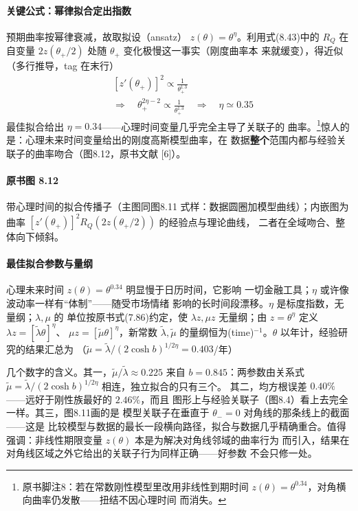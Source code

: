 \paragraph{关键公式：幂律拟合定出指数}
预期曲率按幂律衰减，故取拟设（ansatz）
$z(\theta)=\theta^{\eta}$。利用式(8.43)中的 $R_{Q}$ 在自变量
$2z(\theta_{+}/2)$ 处随 $\theta_{+}$ 变化极慢这一事实（刚度曲率本
来就缓变），得近似（多行推导，tag 在末行）
\begin{align*}
&[z'(\theta_{+})]^{2}\propto\frac{1}{\theta_{+}^{1.3}}\\
&\Rightarrow\quad\theta_{+}^{2\eta-2}\propto\frac{1}{\theta_{+}^{1.3}}
\quad\Rightarrow\quad\eta\simeq0.35
\tag{8.44}
\end{align*}
最佳拟合给出 $\eta=0.34$——心理时间变量几乎完全主导了关联子的
曲率。\footnote{原书脚注8：若在常数刚性模型里改用非线性到期时间
$z(\theta)=\theta^{0.34}$，对角横向曲率仍发散——扭结不因心理时间
而消失。}惊人的是：心理未来时间变量给出的刚度高斯模型曲率，在
数据\textbf{整个}范围内都与经验关联子的曲率吻合（图8.12，原书文献
[6]）。
\paragraph{原书图 8.12}\quad 带心理时间的拟合传播子（主图同图8.11
式样：数据圆圈加模型曲线）；内嵌图为曲率
$[z'(\theta_{+})]^{2}R_{Q}(2z(\theta_{+}/2))$ 的经验点与理论曲线，
二者在全域吻合、整体向下倾斜。

\paragraph{最佳拟合参数与量纲}
心理未来时间 $z(\theta)=\theta^{0.34}$ 明显慢于日历时间，它影响
一切金融工具；$\eta$ 或许像波动率一样有“体制”——随受市场情绪
影响的长时间段漂移。$\eta$ 是标度指数，无量纲；$\lambda,\mu$ 的
单位按原书式(7.86)约定，使 $\lambda z,\mu z$ 无量纲；由 $z=\theta^{\eta}$
定义 $\lambda z=[\tilde{\lambda}\theta]^{\eta}$、
$\mu z=[\tilde{\mu}\theta]^{\eta}$，新常数 $\tilde{\lambda},\tilde{\mu}$
的量纲恒为(time)$^{-1}$。$\theta$ 以年计，经验研究的结果汇总为
（$\tilde{\mu}=\tilde{\lambda}/(2\cosh b)^{1/2\eta}=0.403$/年）
\begin{center}
\end{center}
几个数字的含义。其一，$\tilde{\mu}/\tilde{\lambda}\approx0.225$
来自 $b=0.845$：两参数由关系式 $\tilde{\mu}
=\tilde{\lambda}/(2\cosh b)^{1/2\eta}$ 相连，独立拟合的只有三个。
其二，均方根误差 $0.40\%$——远好于刚性族最好的 $2.46\%$，而且
图形上与经验关联子（图8.4）看上去完全一样。其三，图8.11画的是
模型关联子在垂直于 $\theta_{-}=0$ 对角线的那条线上的截面——这是
比较模型与数据的最长一段横向路径，拟合与数据几乎精确重合。值得
强调：非线性期限变量 $z(\theta)$ 本是为解决对角线邻域的曲率行为
而引入，结果在对角线区域之外它给出的关联子行为同样正确——好参数
不会只修一处。


